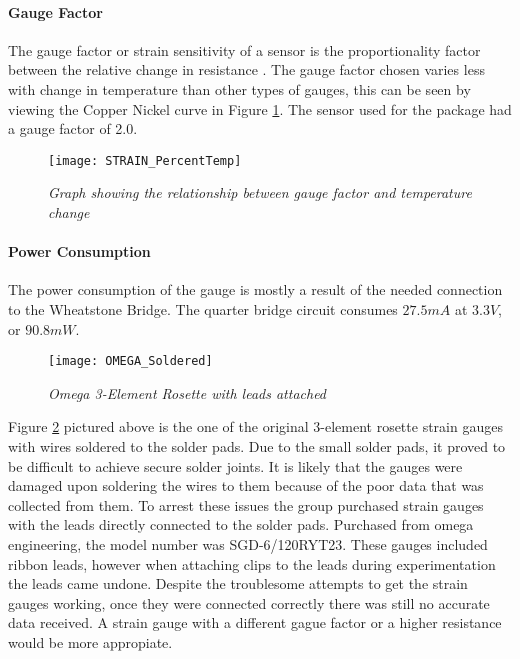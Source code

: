 \paragraph{Gauge Factor}
\indent The gauge factor or strain sensitivity of a sensor is the proportionality factor between the relative change in resistance . The gauge factor chosen varies less with change in temperature than other types of gauges, this can be seen by viewing the Copper Nickel curve in Figure \ref{fig:STRAIN_GFvT}. The sensor used for the package had a gauge factor of 2.0.

\begin{figure}
\centering
\texttt{[image: STRAIN\_PercentTemp]}
\caption{\textit{Graph showing the relationship between gauge factor and temperature change}\cite{OmegaEngineeering:2013}}
\label{fig:STRAIN_GFvT}
\end{figure}

\paragraph{Power Consumption}
\indent The power consumption of the gauge is mostly a result of the needed connection to the Wheatstone Bridge. The quarter bridge circuit consumes $27.5 mA$ at $3.3V$, or $90.8mW$.



\begin{figure}[H]
\centering
\texttt{[image: OMEGA\_Soldered]}
\caption{\textit{Omega 3-Element Rosette with leads attached}}
\label{fig:Soldered Strain Gauge}
\end{figure}

\indent Figure \ref{fig:Soldered Strain Gauge} pictured above is the one of the original 3-element rosette strain gauges with wires soldered to the solder pads. Due to the small solder pads, it proved to be difficult to achieve secure solder joints. It is likely that the gauges were damaged upon soldering the wires to them because of the poor data that was collected from them. To arrest these issues the group purchased strain gauges with the leads directly connected to the solder pads. Purchased from omega engineering, the model number was SGD-6/120RYT23. These gauges included ribbon leads, however when attaching clips to the leads during experimentation the leads came undone. Despite the troublesome attempts to get the strain gauges working, once they were connected correctly there was still no accurate data received. A strain gauge with a different gague factor or a higher resistance would be more appropiate.
